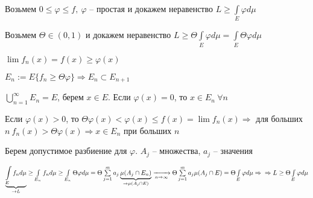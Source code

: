 \documentclass[12pt]{article}
\begin{document}
Возьмем $0 \leq \varphi \leq f,\ \varphi$ -- простая и докажем неравенство $L \geq \int\limits_E \varphi d\mu$

Возьмем $\Theta \in (0, 1)$ и докажем неравенство $L \geq \Theta\int\limits_E \varphi d\mu = \int\limits_E \Theta\varphi d\mu$

$\lim f_n(x) = f(x) \geq \varphi(x)$

$E_n := E\{f_n \geq \Theta\varphi\} \Rightarrow E_n \subset E_{n + 1}$

$\bigcup\limits_{n = 1}^\infty E_n = E$, берем $x \in E$. Если $\varphi(x) = 0$, то $x \in E_n\ \forall n$

Если $\varphi(x) > 0$, то $\Theta\varphi(x) < \varphi(x) \leq f(x) = \lim f_n(x) \Rightarrow$ для больших $n\ f_n(x) > \Theta\varphi(x) \Rightarrow x \in E_n$ при больших $n$

Берем допустимое разбиение для $\varphi$. $A_j$ -- множества, $a_j$ -- значения

$\underbrace{\int\limits_E f_nd\mu}_{\to L} \geq \int\limits_{E_n} f_nd\mu \geq \int\limits_{E_n} \Theta\varphi d\mu = \Theta \sum\limits_{j = 1}^m a_j \underbrace{\mu(A_j \cap E_n)}_{\to \mu(A_j \cap E)} \xrightarrow[n \to \infty]{} \Theta \sum\limits_{j = 1}^m a_j \mu(A_j \cap E) = \Theta \int\limits_E \varphi d\mu \Rightarrow \\ \Rightarrow L \geq \Theta \int\limits_E \varphi d\mu$
\end{document}
